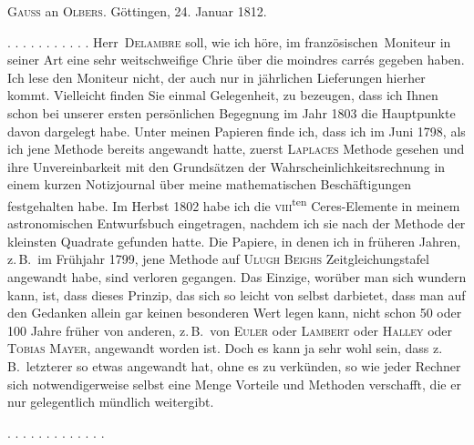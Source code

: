 \clearpage
{}
\begin{center}
\textsc{Gauss} an \textsc{Olbers}. Göttingen, 24. Januar 1812.
\end{center}

\noindent . . . . . . . . . . . Herr\ \textsc{Delambre} soll, wie ich höre, im französischen\ Moniteur in seiner Art eine sehr weitschweifige Chrie über die moindres carrés gegeben haben. Ich lese den Moniteur nicht, der auch nur in jährlichen Lieferungen hierher kommt. Vielleicht finden Sie einmal Gelegenheit,  zu bezeugen, dass ich Ihnen schon bei unserer ersten persönlichen Begegnung im Jahr 1803 die Hauptpunkte davon dargelegt habe. Unter meinen Papieren finde ich, dass ich im Juni 1798, als ich jene Methode bereits  angewandt hatte, zuerst \textsc{Laplaces} Methode gesehen und ihre Unvereinbarkeit mit den Grundsätzen der Wahrscheinlichkeitsrechnung in einem kurzen Notizjournal über meine mathematischen Beschäftigungen festgehalten habe. Im Herbst 1802 habe ich die \textsc{viii}\textsuperscript{ten} Ceres-Elemente in meinem astronomischen Entwurfsbuch eingetragen, nachdem ich sie nach der Methode der kleinsten Quadrate gefunden hatte. Die Papiere, in denen ich in früheren Jahren, z.\,B.\ im Frühjahr 1799, jene Methode auf \textsc{Ulugh Beighs} Zeitgleichungstafel angewandt habe, sind verloren gegangen. Das Einzige, worüber man sich wundern kann, ist, dass dieses Prinzip, das sich so leicht von selbst darbietet, dass man auf den Gedanken allein gar keinen besonderen Wert legen kann, nicht schon 50 oder 100 Jahre früher von anderen, z.\,B.\ von \textsc{Euler} oder \textsc{Lambert} oder \textsc{Halley} oder \textsc{Tobias Mayer}, angewandt worden ist. Doch es kann ja sehr wohl sein, dass z.\,B.\ letzterer so etwas angewandt hat, ohne es zu verkünden, so wie jeder Rechner sich notwendigerweise selbst eine Menge Vorteile und Methoden verschafft, die er nur gelegentlich mündlich weitergibt.

\noindent . . . . . . . . . . . . .

